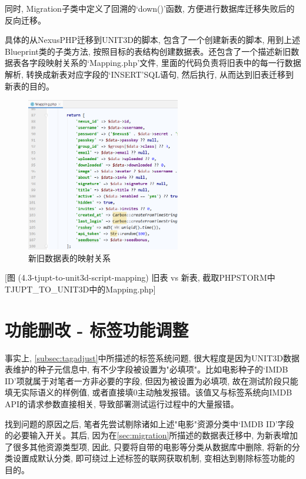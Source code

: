 同时, Migration子类中定义了回溯的`down()'函数, 方便进行数据库迁移失败后的反向迁移。

具体的从NexusPHP迁移到UNIT3D的脚本, 包含了一个创建新表的脚本, 用到上述Blueprint类的子类方法, 按照目标的表结构创建数据表。还包含了一个描述新旧数据表各字段映射关系的`Mapping.php'文件, 里面的代码负责将旧表中的每一行数据解析, 转换成新表对应字段的`INSERT'SQL语句, 然后执行, 从而达到旧表迁移到新表的目的。

\begin{figure}[ht]
    \centering
    \includegraphics[width=0.6\textwidth]{support-files/4.3-tjupt-to-unit3d-script-mapping.png}
    \caption{新旧数据表的映射关系}
    \label{fig:mapnexusphpunit3d}
\end{figure}

[图 (4.3-tjupt-to-unit3d-script-mapping) 旧表 vs 新表, 截取PHPSTORM中TJUPT\_TO\_UNIT3D中的Mapping.php]


\section{功能删改 - 标签功能调整}

事实上, \ref{subsec:tagadjust}中所描述的标签系统问题, 很大程度是因为UNIT3D数据表维护的种子元信息中, 有不少字段被设置为"必填项"。比如电影种子的`IMDB ID'项就属于对笔者一方非必要的字段, 但因为被设置为必填项, 故在测试阶段只能填无实际语义的样例值, 或者直接填0主动触发报错。该值又与标签系统向IMDB API的请求参数直接相关, 导致部署测试运行过程中的大量报错。

找到问题的原因之后, 笔者先尝试剔除诸如上述"电影"资源分类中`IMDB ID'字段的必要输入开关。其后, 因为在\ref{sec:migration}所描述的数据表迁移中, 为新表增加了很多其他资源类型项, 因此, 只要将自带的电影等分类从数据库中删除, 将新的分类设置成默认分类, 即可绕过上述标签的联网获取机制, 变相达到剔除标签功能的目的。

